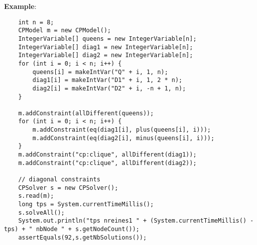 \textbf{Example}:
\begin{lstlisting}
	int n = 8;
	CPModel m = new CPModel();
	IntegerVariable[] queens = new IntegerVariable[n];
	IntegerVariable[] diag1 = new IntegerVariable[n];
	IntegerVariable[] diag2 = new IntegerVariable[n];
	for (int i = 0; i < n; i++) {
	    queens[i] = makeIntVar("Q" + i, 1, n);
	    diag1[i] = makeIntVar("D1" + i, 1, 2 * n);
	    diag2[i] = makeIntVar("D2" + i, -n + 1, n);
	}
	
	m.addConstraint(allDifferent(queens));
	for (int i = 0; i < n; i++) {
	    m.addConstraint(eq(diag1[i], plus(queens[i], i)));
	    m.addConstraint(eq(diag2[i], minus(queens[i], i)));
	}
	m.addConstraint("cp:clique", allDifferent(diag1));
	m.addConstraint("cp:clique", allDifferent(diag2));
	
	// diagonal constraints
	CPSolver s = new CPSolver();
	s.read(m);
	long tps = System.currentTimeMillis();
	s.solveAll();
	System.out.println("tps nreines1 " + (System.currentTimeMillis() - tps) + " nbNode " + s.getNodeCount());
	assertEquals(92,s.getNbSolutions());
\end{lstlisting}
